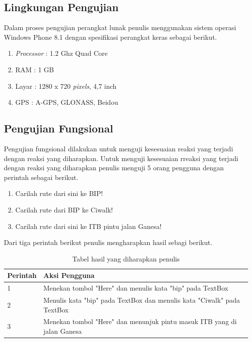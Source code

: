\subsection{Lingkungan Pengujian}
\label{lab:Lingkungan Pengujian}
\hspace{0.5cm} Dalam proses pengujian perangkat lunak penulis menggunakan sistem operasi Windows Phone 8.1 dengan spesifikasi perangkat keras sebagai berikut.
\begin{enumerate}
	\item \textit{Processor} : 1.2 Ghz Quad Core
	\item RAM : 1 GB
	\item Layar : 1280 x 720 \textit{pixels}, 4,7 inch
	\item GPS : A-GPS, GLONASS, Beidou
\end{enumerate}

\subsection{Pengujian Fungsional}
\label{lab:Pengujian Fungsional}
\hspace{0.5cm} Pengujian fungsional dilakukan untuk menguji kesesuaian reaksi yang terjadi dengan reaksi yang diharapkan. Untuk menguji kesesuaian rreaksi yang terjadi dengan reaksi yang diharapkan penulis menguji 5 orang pengguna dengan perintah sebagai berikut. 
\begin{enumerate}
	\item Carilah rute dari sini ke BIP!
	\item Carilah rute dari BIP ke Ciwalk!
	\item Carilah rute dari sini ke ITB pintu jalan Ganesa!
\end{enumerate}

Dari tiga perintah berikut penulis mengharapkan hasil sebagi berikut.
\begin{table}[h]
	\centering
		\begin{tabular}{|p{2cm}|p{10cm}|}\hline
				Perintah & Aksi Pengguna \\ \hline
				1 & Menekan tombol "Here" dan menulis kata "bip" pada TextBox \\ \hline
				2 & Menulis kata "bip" pada TextBox dan menulis kata "Ciwalk" pada TextBox \\ \hline
				3 & Menekan tombol "Here" dan menunjuk pintu masuk ITB yang di jalan Ganesa \\ \hline
		\end{tabular}
	\caption{Tabel hasil yang diharapkan penulis}
	\label{tab:TabelHasilyangdiharapkanPenulis}
\end{table}

